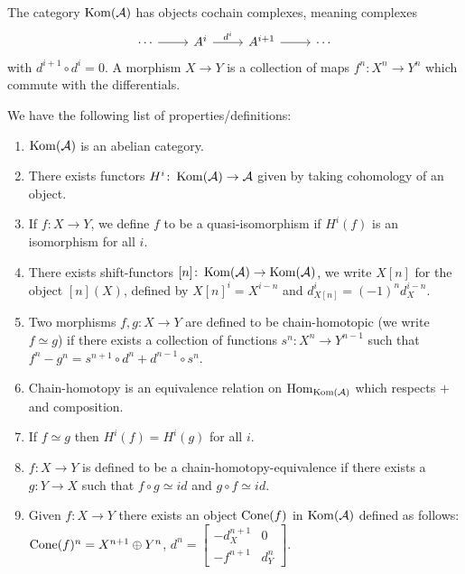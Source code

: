 \documentclass[a4paper, UKenglish]{report}
\begin{document}
The category $\operatorname{Kom}(\mathcal{A})$ has objects cochain complexes, meaning complexes 
\[
    \begin{tikzcd}
		\cdots \arrow[r] & A^i \arrow[r, "d^i"] & A^{i+1} \arrow[r] & \cdots
	\end{tikzcd}
\]
with $d^{i+1} \circ d^i = 0$. A morphism  $X \to Y$ is a collection of maps $f^n \colon X^n \to Y^n$ which commute with the differentials.

We have the following list of properties/definitions:

\begin{enumerate}
    \item $\operatorname{Kom}(\mathcal{A})$ is an abelian category.

    \item There exists functors $H^i \colon \operatorname{Kom}(\mathcal{A}) \to \mathcal{A}$ given by taking cohomology of an object.

    \item If $f \colon X \to Y$, we define $f$ to be a quasi-isomorphism if $H^i(f)$ is an isomorphism for all $i$.

    \item There exists shift-functors $[n] \colon \operatorname{Kom}(\mathcal{A}) \to \operatorname{Kom}(\mathcal{A})$, we write $X[n]$ for the object $[n](X)$, defined by $X[n]^i = X^{i - n}$ and $d_{X[n]}^i = (-1)^n d_X^{i-n}$.

    \item Two morphisms $f,g: X \to Y$ are defined to be chain-homotopic (we write $f \simeq g$) if there exists a collection of functions $s^n \colon X^n \to Y^{n-1}$ such that $f^n-g^n=s^{n+1} \circ d^n + d^{n-1} \circ s^n$.

    \item Chain-homotopy is an equivalence relation on $\operatorname{Hom}_{\operatorname{Kom}(\mathcal{A})}$ which respects $+$ and composition.

    \item If $f \simeq g$ then $H^i(f) = H^i(g)$ for all $i$.

    \item $f \colon X \to Y$ is defined to be a chain-homotopy-equivalence if there exists a $g \colon Y \to X$ such that $f \circ g \simeq id$ and $g \circ f \simeq id$.
    
    \item Given $f \colon X \to Y$ there exists an object $\operatorname{Cone}(f)$ in $\operatorname{Kom}(\mathcal{A})$ defined as follows: $\operatorname{Cone}(f)^n = X^{n+1} \oplus Y^n$, 
    $
        d^n 
        = 
        \begin{bmatrix} 
            -d_X^{n+1} & 0 \\ 
            -f^{n+1}   & d_Y^n 
        \end{bmatrix}.
    $


\end{enumerate}
\end{document}
